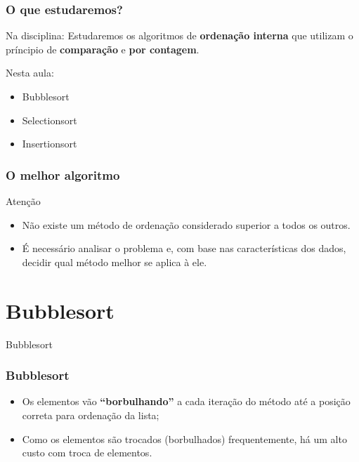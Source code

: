 \documentclass[aspectratio=169]{beamer}
\begin{document}

\begin{frame}
\frametitle{O que estudaremos?}
\begin{block}{Na disciplina:}
Estudaremos os algoritmos de {\bf ordenação interna} que utilizam o príncipio de {\bf comparação} e {\bf por contagem}.
\end{block}
\begin{block}{Nesta aula:}
   \begin{itemize}
	\item Bubblesort
	\item Selectionsort 
	\item Insertionsort
   \end{itemize} 
\end{block}
\end{frame}


\begin{frame}
\frametitle{O melhor algoritmo}
  \begin{block}{Atenção}
   \begin{itemize}
    \item Não existe um método de ordenação considerado superior a todos os outros.
    \item É necessário analisar o problema e, com base nas características dos dados, decidir qual método melhor se aplica à ele.
   \end{itemize}
  \end{block}
\end{frame}

\section{Bubblesort}

\begin{frame}
\Huge{\centerline{Bubblesort}}
\end{frame}

\begin{frame}
\frametitle{Bubblesort}
\begin{itemize}
\item Os elementos vão {\bf ``borbulhando''} a cada iteração do método até a posição correta para ordenação da lista;
\item Como os elementos são trocados (borbulhados) frequentemente, há um alto custo com troca de elementos.
\end{itemize}
\end{frame}
\end{document}
